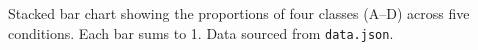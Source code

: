 \caption{Stacked bar chart showing the proportions of four classes (A--D) across five conditions. Each bar sums to 1. Data sourced from \texttt{data.json}.}
